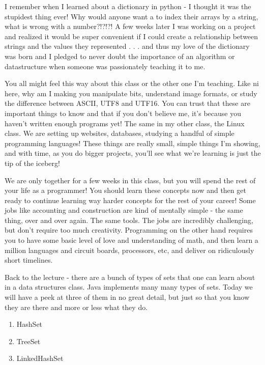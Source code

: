 \documentclass[12pt]{article}
\begin{document}
I remember when I learned about a dictionary in python - I thought it was the stupidest thing ever! Why would anyone want a to index their arrays by a string, what is wrong with a number?!?!?! A few weeks later I was working on a project and realized it would be super convenient if I could create a relationship between strings and the values they represented . . . and thus my love of the dictionary was born and I pledged to never doubt the importance of an algorithm or datastructure when someone was passionately teaching it to me.

You all might feel this way about this class or the other one I'm teaching. Like ni here, why am I making you manipulate bits, understand image formats, or study the difference between ASCII, UTF8 and UTF16. You can trust that these are important things to know and that if you don't believe me, it's because you haven't written enough programs yet! The same in my other class, the Linux class. We are setting up websites, databases, studying a handful of simple programming languages! These things are really small, simple things I'm showing, and with time, as you do bigger projects, you'll see what we're learning is just the tip of the iceberg!

We are only together for a few weeks in this class, but you will spend the rest of your life as a programmer! You should learn these concepts now and then get ready to continue learning way harder concepts for the rest of your career! Some jobs like accounting and construction are kind of mentally simple - the same thing, over and over again. The same tools. The jobs are incredibly challenging, but don't require too much creativity. Programming on the other hand requires you to have some basic level of love and understanding of math, and then learn a million languages and circuit boards, processors, etc, and deliver on ridiculously short timelines. 

Back to the lecture - there are a bunch of types of sets that one can learn about in a data structures class. Java implements many many types of sets. Today we will have a peek at three of them in no great detail, but just so that you know they are there and more or less what they do.

\begin{enumerate}
\item HashSet
\item TreeSet
\item LinkedHashSet
\end{enumerate}
\end{document}
